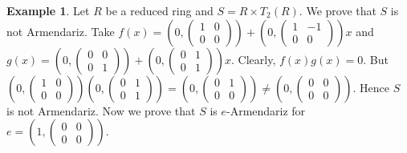 \documentclass[12pt]{amsart}
\theoremstyle{plain}
\theoremstyle{definition}
\newtheorem{example}{Example}[section]
\theoremstyle{remark}
\numberwithin{equation}{section}
\begin{document}
\begin{example}
	Let $R$ be a reduced ring and $S=R\times T_2(R)$. We prove that $S$ is not Armendariz. Take $f(x)=\left(0,\begin{pmatrix}
		1&0\\0&0
	\end{pmatrix}\right)+\left(0,\begin{pmatrix}
	1&-1\\0&0
	\end{pmatrix}\right)x$ and $g(x)=\left(0,\begin{pmatrix}
	0&0\\0&1
	\end{pmatrix}\right)+\left(0,\begin{pmatrix}
	0&1\\0&1
	\end{pmatrix}\right)x$. Clearly, $f(x)g(x)=0$. But $\left(0,\begin{pmatrix}
	1&0\\0&0
	\end{pmatrix}\right)\left(0,\begin{pmatrix}
	0&1\\0&1
	\end{pmatrix}\right)=\left(0,\begin{pmatrix}
	0&1\\0&0
	\end{pmatrix}\right)\ne \left(0,\begin{pmatrix}
	0&0\\0&0
	\end{pmatrix}\right)$. Hence $S$ is not Armendariz. Now we prove that $S$ is $e$-Armendariz for $e=\left(1,\begin{pmatrix}
	0&0\\0&0
	\end{pmatrix}\right).$
\end{example}
\end{document}

